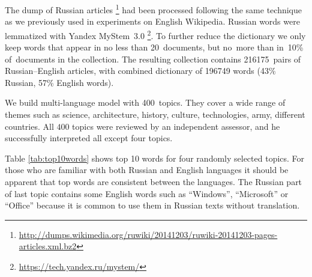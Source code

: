 \documentclass[russian]{llncs}
\begin{document}
The dump of Russian articles%
\footnote{\url{http://dumps.wikimedia.org/ruwiki/20141203/ruwiki-20141203-pages-articles.xml.bz2}}
had been processed following the same technique as we previously used in experiments on English Wikipedia.
Russian words were lemmatized with Yandex MyStem~3.0%
\footnote{\url{https://tech.yandex.ru/mystem/}}.
To further reduce the dictionary we only keep words
that appear in no less than 20~documents, but no~more than in~10\% of~documents in the collection.
The resulting collection contains 216175~pairs of Russian--English articles, with combined dictionary
of 196749 words (43\% Russian, 57\% English words).

We build multi-language model with 400~topics.
They cover a wide range of themes such as science, architecture, history, culture, technologies, army, different countries.
All $400$ topics were reviewed by an independent assessor,
and he successfully interpreted all except four topics.

Table \ref{tab:top10words} shows top 10 words for four randomly selected topics.
For those who are familiar with both Russian and English languages it should be apparent that top words are consistent between the languages.
The Russian part of last topic contains some English words such as
``Windows'', ``Microsoft'' or ``Office'' because it is common to use them in Russian texts without translation.
\end{document}
